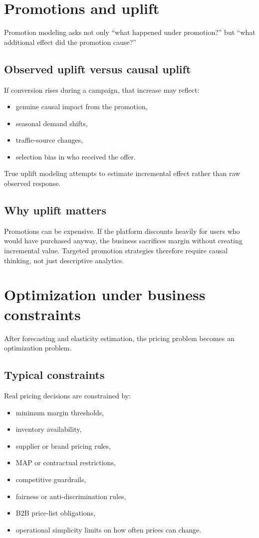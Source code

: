 \section{Promotions and uplift}
Promotion modeling asks not only ``what happened under promotion?'' but ``what additional effect did the promotion cause?''

\subsection{Observed uplift versus causal uplift}
If conversion rises during a campaign, that increase may reflect:
\begin{itemize}
  \item genuine causal impact from the promotion,
  \item seasonal demand shifts,
  \item traffic-source changes,
  \item selection bias in who received the offer.
\end{itemize}

True uplift modeling attempts to estimate incremental effect rather than raw observed response.

\subsection{Why uplift matters}
Promotions can be expensive.
If the platform discounts heavily for users who would have purchased anyway, the business sacrifices margin without creating incremental value.
Targeted promotion strategies therefore require causal thinking, not just descriptive analytics.

\section{Optimization under business constraints}
After forecasting and elasticity estimation, the pricing problem becomes an optimization problem.

\subsection{Typical constraints}
Real pricing decisions are constrained by:
\begin{itemize}
  \item minimum margin thresholds,
  \item inventory availability,
  \item supplier or brand pricing rules,
  \item MAP or contractual restrictions,
  \item competitive guardrails,
  \item fairness or anti-discrimination rules,
  \item B2B price-list obligations,
  \item operational simplicity limits on how often prices can change.
\end{itemize}

